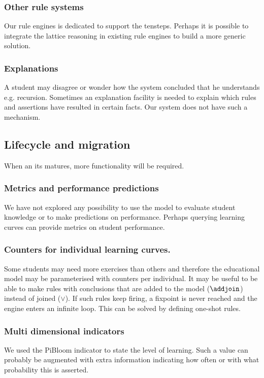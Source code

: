 \subsubsection{Other rule systems}
Our rule engines is dedicated to support the \gls{tensteps}. 
Perhaps it is possible to integrate the lattice reasoning in existing rule engines to build a more generic solution.

\subsubsection{Explanations}
A student may disagree or wonder how the system concluded that he understands e.g. recursion.
Sometimes an explanation facility is needed to explain which rules and assertions have resulted in certain facts.
Our system does not have such a mechanism.


\subsection{Lifecycle and migration}

When an \gls{its} matures, more functionality will be required.  

\subsubsection{Metrics and performance predictions}
We have not explored any possibility to use the model to evaluate student knowledge or to make predictions on performance.
Perhaps querying learning curves can provide metrics on student performance.

\subsubsection{Counters for individual learning curves.}
Some students may need more exercises than others and therefore the educational model may be parameterised with counters per individual.
It may be useful to be able to make rules with conclusions that are added to the model ($\addjoin$) instead of joined ($\lor$).
If such rules keep firing, a fixpoint is never reached and the engine enters an infinite loop.
This can be solved by defining one-shot rules.

\subsubsection{Multi dimensional indicators}
We used the PiBloom indicator to state the level of learning.
Such a value can probably be augmented with extra information indicating how often or with what probability this is asserted.


